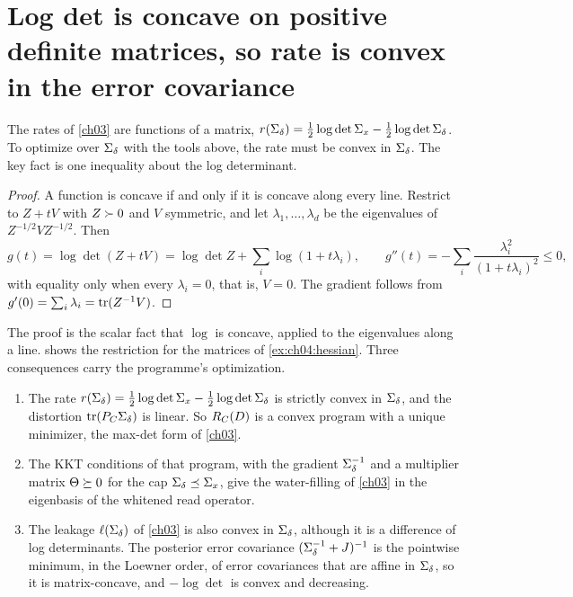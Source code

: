 \section{Log det is concave on positive definite matrices, so rate is convex in the error covariance}\label{sec:ch04:logdet}

The rates of \cref{ch03} are functions of a matrix, $r(\Sigma_\delta)=\frac12\log\det\Sigma_x-\frac12\log\det\Sigma_\delta$. To optimize over $\Sigma_\delta$ with the tools above, the rate must be convex in $\Sigma_\delta$. The key fact is one inequality about the log determinant.

\begin{proof}
A function is concave if and only if it is concave along every line. Restrict to $Z+tV$ with $Z\succ0$ and $V$ symmetric, and let $\lambda_1,\dots,\lambda_d$ be the eigenvalues of $Z^{-1/2}VZ^{-1/2}$. Then
\[
g(t)=\log\det(Z+tV)=\log\det Z+\sum_i\log(1+t\lambda_i),\qquad
g''(t)=-\sum_i\frac{\lambda_i^2}{(1+t\lambda_i)^2}\le0,
\]
with equality only when every $\lambda_i=0$, that is, $V=0$. The gradient follows from $g'(0)=\sum_i\lambda_i=\operatorname{tr}(Z^{-1}V)$.
\end{proof}

The proof is the scalar fact that $\log$ is concave, applied to the eigenvalues along a line.  shows the restriction for the matrices of \cref{ex:ch04:hessian}. Three consequences carry the programme's optimization.
\begin{enumerate}[nosep]
\item The rate $r(\Sigma_\delta)=\frac12\log\det\Sigma_x-\frac12\log\det\Sigma_\delta$ is strictly convex in $\Sigma_\delta$, and the distortion $\operatorname{tr}(P_C\Sigma_\delta)$ is linear. So $R_C(D)$ is a convex program with a unique minimizer, the max-det form of \cref{ch03}.
\item The KKT conditions of that program, with the gradient $\Sigma_\delta^{-1}$ and a multiplier matrix $\Theta\succeq0$ for the cap $\Sigma_\delta\preceq\Sigma_x$, give the water-filling of \cref{ch03} in the eigenbasis of the whitened read operator.
\item The leakage $\ell(\Sigma_\delta)$ of \cref{ch03} is also convex in $\Sigma_\delta$, although it is a difference of log determinants. The posterior error covariance $(\Sigma_\delta^{-1}+J)^{-1}$ is the pointwise minimum, in the Loewner order, of error covariances that are affine in $\Sigma_\delta$, so it is matrix-concave, and $-\log\det$ is convex and decreasing.
\end{enumerate}

